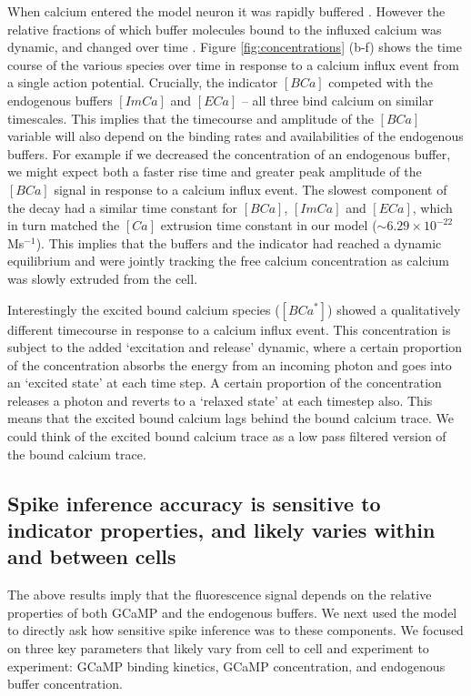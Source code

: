 \documentclass[a4paper,12pt]{article}
\theoremstyle{definition}
\begin{document}

When calcium entered the model neuron it was rapidly buffered \cite{bartol}. However the relative fractions of which buffer molecules bound to the influxed calcium was dynamic, and changed over time . Figure \ref{fig:concentrations} (b-f) shows the time course of the various species over time in response to a calcium influx event from a single action potential. Crucially, the indicator $[BCa]$ competed with the endogenous buffers $[ImCa]$ and $[ECa]$ – all three bind calcium on similar timescales. This implies that the timecourse and amplitude of the $[BCa]$ variable will also depend on the binding rates and availabilities of the endogenous buffers. For example if we decreased the concentration of an endogenous buffer, we might expect both a faster rise time and greater peak amplitude of the $[BCa]$ signal in response to a calcium influx event. The slowest component of the decay had a similar time constant for $[BCa]$, $[ImCa]$ and $[ECa]$, which in turn matched the $[Ca]$ extrusion time constant in our model ($\sim 6.29 \times 10^{-22}$Ms$^{-1}$). This implies that the buffers and the indicator had reached a dynamic equilibrium and were jointly tracking the free calcium concentration as calcium was slowly extruded from the cell.

Interestingly the excited bound calcium species ($[BCa^*]$) showed a qualitatively different timecourse in response to a calcium influx event. This concentration is subject to the added `excitation and release' dynamic, where a certain proportion of the concentration absorbs the energy from an incoming photon and goes into an `excited state' at each time step. A certain proportion of the concentration releases a photon and reverts to a `relaxed state' at each timestep also. This means that the excited bound calcium lags behind the bound calcium trace. We could think of the excited bound calcium trace as a low pass filtered version of the bound calcium trace.

\subsection{Spike inference accuracy is sensitive to indicator properties, and likely varies within and between cells}
The above results imply that the fluorescence signal depends on the relative properties of both GCaMP and the endogenous buffers. We next used the model to directly ask how sensitive spike inference was to these components. We focused on three key parameters that likely vary from cell to cell and experiment to experiment: GCaMP binding kinetics, GCaMP concentration, and endogenous buffer concentration.
\end{document}
